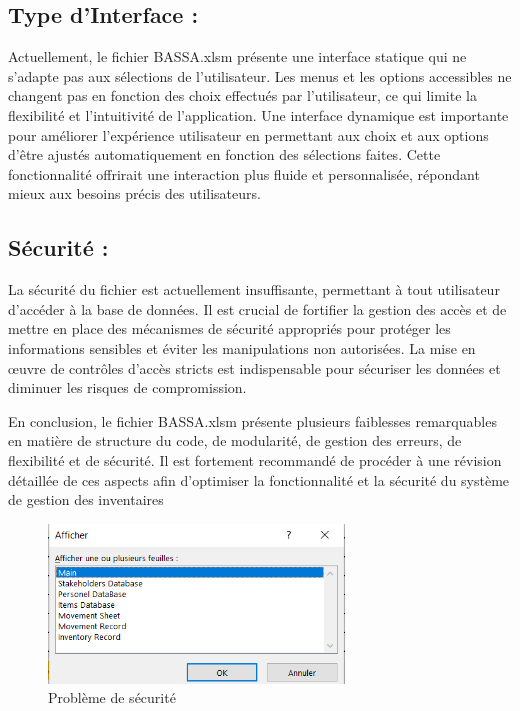 \documentclass[a4paper, oneside, 12pt, final]{extreport}
\begin{document}
\subsection{Type d'Interface :}
Actuellement, le fichier BASSA.xlsm présente une interface statique qui ne s'adapte pas aux sélections de l'utilisateur. Les menus et les options accessibles ne changent pas en fonction des choix effectués par l'utilisateur, ce qui limite la flexibilité et l'intuitivité de l'application. Une interface dynamique est importante pour améliorer l'expérience utilisateur en permettant aux choix et aux options d'être ajustés automatiquement en fonction des sélections faites. Cette fonctionnalité offrirait une interaction plus fluide et personnalisée, répondant mieux aux besoins précis des utilisateurs.

\subsection{Sécurité :}
La sécurité du fichier est actuellement insuffisante, permettant à tout utilisateur d'accéder à la base de données. Il est crucial de fortifier la gestion des accès et de mettre en place des mécanismes de sécurité appropriés pour protéger les informations sensibles et éviter les manipulations non autorisées. La mise en œuvre de contrôles d'accès stricts est indispensable pour sécuriser les données et diminuer les risques de compromission.

En conclusion, le fichier BASSA.xlsm présente plusieurs faiblesses remarquables en matière de structure du code, de modularité, de gestion des erreurs, de flexibilité et de sécurité. Il est fortement recommandé de procéder à une révision détaillée de ces aspects afin d'optimiser la fonctionnalité et la sécurité du système de gestion des inventaires
\begin{figure}[h]
    \centering
    \includegraphics[width=0.7\textwidth]{Capture2.png} %
    \caption{Problème de sécurité}
    \label{fig:Problème de sécurité}
\end{figure}
\end{document}
